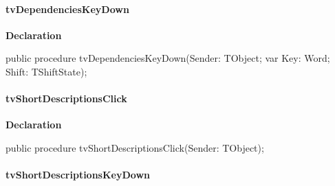 \documentclass{report}
\newif\ifpdf
\begin{document}
\paragraph*{tvDependenciesKeyDown}\hspace*{\fill}

\label{prjwizard.TfrmProjectWizard-tvDependenciesKeyDown}
\begin{list}{}{
\setlength{\itemindent}{0cm}
\setlength{\listparindent}{0cm}
\setlength{\leftmargin}{\evensidemargin}
\addtolength{\leftmargin}{\tmplength}
\settowidth{\labelsep}{X}
\addtolength{\leftmargin}{\labelsep}
\setlength{\labelwidth}{\tmplength}
}
\item[\textbf{Declaration}\hfill]
\ifpdf
\begin{flushleft}
\fi
\begin{ttfamily}
public procedure tvDependenciesKeyDown(Sender: TObject; var Key: Word; Shift: TShiftState);\end{ttfamily}

\ifpdf
\end{flushleft}
\fi

\end{list}
\paragraph*{tvShortDescriptionsClick}\hspace*{\fill}

\label{prjwizard.TfrmProjectWizard-tvShortDescriptionsClick}
\begin{list}{}{
\setlength{\itemindent}{0cm}
\setlength{\listparindent}{0cm}
\setlength{\leftmargin}{\evensidemargin}
\addtolength{\leftmargin}{\tmplength}
\settowidth{\labelsep}{X}
\addtolength{\leftmargin}{\labelsep}
\setlength{\labelwidth}{\tmplength}
}
\item[\textbf{Declaration}\hfill]
\ifpdf
\begin{flushleft}
\fi
\begin{ttfamily}
public procedure tvShortDescriptionsClick(Sender: TObject);\end{ttfamily}

\ifpdf
\end{flushleft}
\fi

\end{list}
\paragraph*{tvShortDescriptionsKeyDown}\hspace*{\fill}
\end{document}
